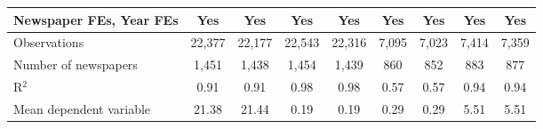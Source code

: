 {\begin{tabular}{l*{8}{c}}
\addlinespace
Newspaper FEs, Year FEs &         Yes         &         Yes         &         Yes         &         Yes         &         Yes         &         Yes         &         Yes         &         Yes         \\
\midrule
Observations        &      22,377         &      22,177         &      22,543         &      22,316         &       7,095         &       7,023         &       7,414         &       7,359         \\
Number of newspapers&       1,451         &       1,438         &       1,454         &       1,439         &         860         &         852         &         883         &         877         \\
R$^2$               &        0.91         &        0.91         &        0.98         &        0.98         &        0.57         &        0.57         &        0.94         &        0.94         \\
Mean dependent variable&       21.38         &       21.44         &        0.19         &        0.19         &        0.29         &        0.29         &        5.51         &        5.51         \\
\bottomrule
\end{tabular}
}
